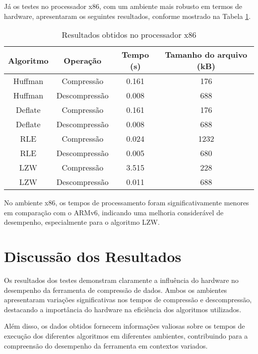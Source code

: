 Já os testes no processador x86, com um ambiente mais robusto em termos de hardware, apresentaram os seguintes resultados, conforme mostrado na Tabela \ref{tab:x86}.

\begin{table}[htbp]
  \centering
  \caption{Resultados obtidos no processador x86}
  \begin{tabular}{|c|c|c|c|}
  \hline
  Algoritmo & Operação & Tempo (s) & Tamanho do arquivo (kB) \\
  \hline
  Huffman & Compressão & 0.161 & 176 \\
  Huffman & Descompressão & 0.008 & 688 \\
  Deflate & Compressão & 0.161 & 176 \\
  Deflate & Descompressão & 0.008 & 688 \\
  RLE & Compressão & 0.024 & 1232 \\
  RLE & Descompressão & 0.005 & 680 \\
  LZW & Compressão & 3.515 & 228 \\
  LZW & Descompressão & 0.011 & 688 \\
  \hline
  \end{tabular}
  \label{tab:x86}
\end{table}

No ambiente x86, os tempos de processamento foram significativamente menores em comparação com o ARMv6, indicando uma melhoria considerável de desempenho, especialmente para o algoritmo LZW.

\section{Discussão dos Resultados}

Os resultados dos testes demonstram claramente a influência do hardware no desempenho da ferramenta de compressão de dados. Ambos os ambientes apresentaram variações significativas nos tempos de compressão e descompressão, destacando a importância do hardware na eficiência dos algoritmos utilizados.

Além disso, os dados obtidos fornecem informações valiosas sobre os tempos de execução dos diferentes algoritmos em diferentes ambientes, contribuindo para a compreensão do desempenho da ferramenta em contextos variados.
